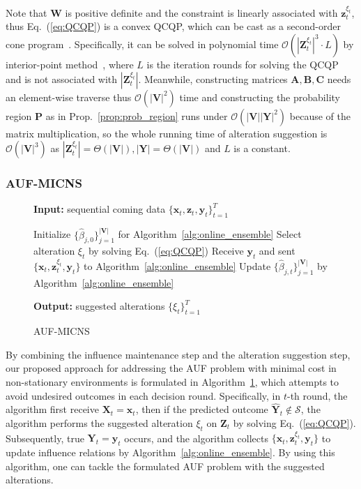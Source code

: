 \documentclass{article}
\theoremstyle{plain}
\theoremstyle{definition}
\theoremstyle{remark}
\def \Eq {Eq.}
\def \prop {Prop.}
\def \x {\mathbf{x}}
\def \Z {\mathbf{Z}}
\def \V {\mathbf{V}}
\def \sS {\mathcal{S}}
\def \X {\mathbf{X}}
\def \P {\mathbf{P}}
\def \Y {\mathbf{Y}}
\def \A {\mathbf{A}}
\def \V {\mathbf{V}}
\def \B {\mathbf{B}}
\def \P {\mathbf{P}}
\def \C {\mathbf{C}}
\def \W {\mathbf{W}}
\def \y {\mathbf{y}}
\def \z {\mathbf{z}}
\begin{document}
Note that $\W$ is positive definite and the constraint is linearly associated with $\z^{\xi_t}_t$, 
thus \Eq~(\ref{eq:QCQP}) is a convex QCQP, 
which can be cast as a second-order cone program~\citep{nesterov1994interior, lobo1998socp}.
Specifically, it can be solved in polynomial time $\mathcal{O}(|\Z_t^{\xi_t}|^3\cdot L)$ by interior-point method~\citep{AndersenRT03SOCP}, where $L$ is the iteration rounds for solving the QCQP and is not associated with $|\Z_t^{\xi_t}|$. 
Meanwhile, constructing matrices $\A,\B,\C$ needs an element-wise traverse thus $\mathcal{O}(|\V|^2)$ time and constructing the probability region $\P$ as in \prop~\ref{prop:prob_region} runs under $\mathcal{O}(|\V||\Y|^2)$ because of the matrix multiplication, so the whole running time of alteration suggestion is $\mathcal{O}(|\V|^3)$ as $|\Z_t^{\xi_t}|= \Theta(|\V|), |\Y| = \Theta(|\V|)$ and $L$ is a constant. 








\subsubsection{AUF-MICNS}
\setlength{\intextsep}{1pt} 
\begin{figure}
  \begin{minipage}{\linewidth}
  \begin{algorithm}[H]
    \caption{AUF-MICNS}
    \label{alg:com_auf}
    \textbf{Input:} sequential coming data $\{\x_t, \z_t, \y_t\}_{t=1}^T$
  \begin{algorithmic}[1]
    \State Initialize $\{\hat{\beta}_{j,0}\}_{j=1}^{|\mathbf{V}|}$ for Algorithm~\ref{alg:online_ensemble}
    \State Select alteration $\xi_t$ by solving \Eq~(\ref{eq:QCQP})
    \State Receive $\y_t$ and sent $\{\x_t, \z^{\xi_t}_t, \y_t\}$ to Algorithm~\ref{alg:online_ensemble}
    \State Update $\{\hat{\beta}_{j, t}\}_{j=1}^{|\mathbf{V}|}$ by Algorithm~\ref{alg:online_ensemble} 
    \EndFor
  \end{algorithmic}
  \textbf{Output:} suggested alterations $\{\xi_t\}_{t=1}^T$
  \end{algorithm}
  \end{minipage}
  \end{figure}

By combining the influence maintenance step and the alteration suggestion step, our proposed approach for addressing the AUF problem with minimal cost in non-stationary environments is formulated in Algorithm~\ref{alg:com_auf}, which attempts to avoid undesired outcomes in each decision round. 
Specifically, in $t$-th round, the algorithm first receive $\X_t = \x_t$, 
then if the predicted outcome $\hat{\Y}_t\not\in \sS$, 
the algorithm performs the suggested alteration $\xi_t$ on $\Z_t$ by solving \Eq~(\ref{eq:QCQP}). 
Subsequently, true $\Y_t = \y_t$ occurs, and the algorithm collects $\{\x_t, \z^{\xi_t}_t, \y_t\}$ to update influence relations by Algorithm~\ref{alg:online_ensemble}. 
By using this algorithm, one can tackle the formulated AUF problem with the suggested alterations. 
\end{document}
